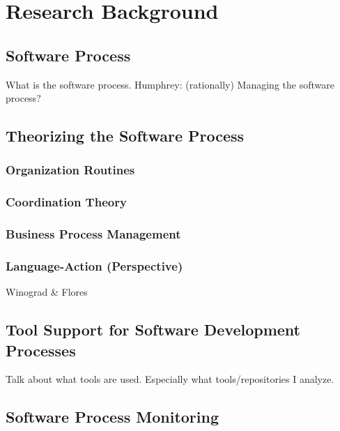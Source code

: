 \chapter{Research Background}
\label{ch2:problem-background}

\section{Software Process}
\label{sec:ch2-software-process}

What is the software process. Humphrey: (rationally) Managing the software process?

\section{Theorizing the Software Process}
\label{sec:ch2-theorizing}

\subsection{Organization Routines}
\label{subsec:org-stud}

\subsection{Coordination Theory}

\subsection{Business Process Management}

\subsection{Language-Action (Perspective)}

Winograd \& Flores~\citep{Winograd1986a}

\section{Tool Support for Software Development Processes}
\label{sec:ch2-tool-support}

Talk about what tools are used.
Especially what tools/repositories I analyze. 



\section{Software Process Monitoring }
\label{sec:ch2-sw-p-monitoring}

